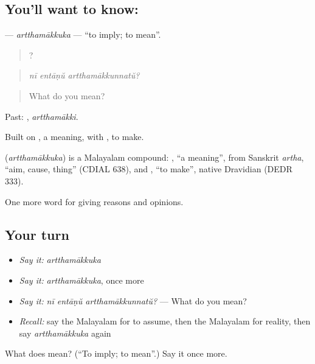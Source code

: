 \subsection*{You'll want to know: }
\textbf{} — \emph{artthamākkuka} — \textquotedblleft{}to imply; to mean\textquotedblright{}.

\begin{quote}
  ?
\end{quote}

\begin{quote}
\emph{nī entāṇŭ artthamākkunnatŭ?}
\end{quote}

\begin{quote}
What do you mean?
\end{quote}

Past: , \emph{artthamākki}.

Built on , a meaning, with , to make.

\begin{cousinweb}
\textbf{} (\emph{artthamākkuka}) is a Malayalam compound: , \textquotedblleft{}a meaning\textquotedblright{}, from Sanskrit \emph{artha}, \textquotedblleft{}aim, cause, thing\textquotedblright{} (CDIAL 638), and , \textquotedblleft{}to make\textquotedblright{}, native Dravidian (DEDR 333).
\end{cousinweb}

\begin{grammarlens}[title={What you've built}]
One more word for giving reasons and opinions.
\end{grammarlens}

\subsection*{Your turn}
\begin{itemize}
\raggedright
  \item \emph{Say it:} \emph{artthamākkuka}
  \item \emph{Say it:} \emph{artthamākkuka}, once more
  \item \emph{Say it:} \emph{nī entāṇŭ artthamākkunnatŭ?} — What do you mean?
  \item \emph{Recall:} say the Malayalam for to assume, then the Malayalam for reality, then say \emph{artthamākkuka} again
\end{itemize}

\begin{tcolorbox}[breakable,colback=teal!4,colframe=teal!35!black,title={Before you move on}]
What does  mean? (\textquotedblleft{}To imply; to mean\textquotedblright{}.) Say it once more.
\end{tcolorbox}
